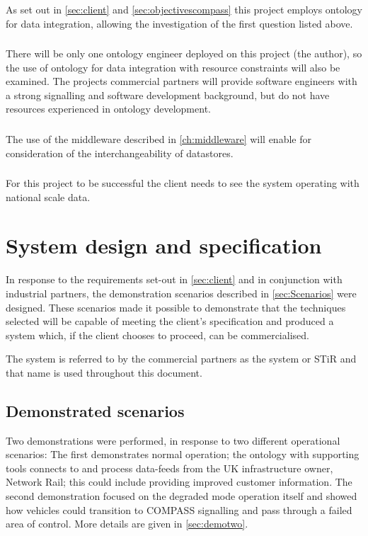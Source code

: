 \subsubsection*{\textsc{\QuestionOtherData}} 
As set out in \autoref{sec:client} and \autoref{sec:objectivescompass} this project employs ontology for data integration, allowing the investigation of the first question listed above.
\subsubsection*{\textsc{\QuestionSkillz}}
There will be only one ontology engineer deployed on this project (the author), so the use of ontology for data integration with resource constraints will also be examined. The projects commercial partners will provide software engineers with a strong signalling and software development background, but do not have resources experienced in ontology development. 
\subsubsection*{\textsc{\QuestionChange}}
The use of the middleware described in \autoref{ch:middleware} will enable for consideration of the interchangeability of datastores. 
\subsubsection*{\textsc{\QuestionCanOntologyScale}}
For this project to be successful the client needs to see the system operating with national scale data.


\section{System design and specification}
In response to the requirements set-out in \autoref{sec:client} and in conjunction with industrial partners, the demonstration scenarios described in \autoref{sec:Scenarios} were designed. These scenarios made it possible to demonstrate that the techniques selected will be capable of meeting the client's specification and produced a system which, if the client chooses to proceed, can be commercialised. 

The system is referred to by the commercial partners as the  system or STiR and that name is used throughout this document.
\subsection{Demonstrated scenarios}
\label{sec:Scenarios}
Two demonstrations were performed, in response to two different operational scenarios: The first demonstrates normal operation; the ontology with supporting tools connects to and process data-feeds from the UK infrastructure owner, Network Rail; this could include providing improved customer information. The second demonstration focused on the degraded mode operation itself and showed how vehicles could transition to COMPASS signalling and pass through a failed area of control. More details are given in \autoref{sec:demotwo}.

